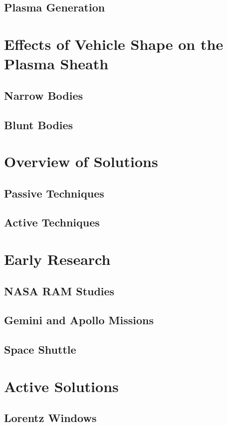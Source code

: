 \documentclass[twocolumn]{article}
\begin{document}
\subsection{Plasma Generation}


\section{Effects of Vehicle Shape on the Plasma Sheath}
\subsection{Narrow Bodies}
\subsection{Blunt Bodies}


\section{Overview of Solutions}
\subsection{Passive Techniques}
\subsection{Active Techniques}

	
\section{Early Research}
\subsection{NASA RAM Studies}
\subsection{Gemini and Apollo Missions}
\subsection{Space Shuttle}

\section{Active Solutions}
\subsection{Lorentz Windows}
\end{document}
